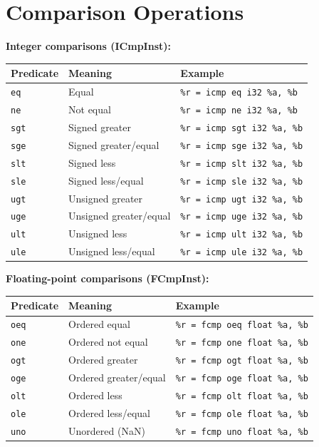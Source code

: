 \section{Comparison Operations}

\textbf{Integer comparisons (ICmpInst):}
\begin{longtable}{|p{2.5cm}|p{3cm}|p{7cm}|}
\hline
\textbf{Predicate} & \textbf{Meaning} & \textbf{Example} \\
\hline
\texttt{eq} & Equal & \texttt{\%r = icmp eq i32 \%a, \%b} \\
\hline
\texttt{ne} & Not equal & \texttt{\%r = icmp ne i32 \%a, \%b} \\
\hline
\texttt{sgt} & Signed greater & \texttt{\%r = icmp sgt i32 \%a, \%b} \\
\hline
\texttt{sge} & Signed greater/equal & \texttt{\%r = icmp sge i32 \%a, \%b} \\
\hline
\texttt{slt} & Signed less & \texttt{\%r = icmp slt i32 \%a, \%b} \\
\hline
\texttt{sle} & Signed less/equal & \texttt{\%r = icmp sle i32 \%a, \%b} \\
\hline
\texttt{ugt} & Unsigned greater & \texttt{\%r = icmp ugt i32 \%a, \%b} \\
\hline
\texttt{uge} & Unsigned greater/equal & \texttt{\%r = icmp uge i32 \%a, \%b} \\
\hline
\texttt{ult} & Unsigned less & \texttt{\%r = icmp ult i32 \%a, \%b} \\
\hline
\texttt{ule} & Unsigned less/equal & \texttt{\%r = icmp ule i32 \%a, \%b} \\
\hline
\end{longtable}

\textbf{Floating-point comparisons (FCmpInst):}
\begin{longtable}{|p{2.5cm}|p{3cm}|p{7cm}|}
\hline
\textbf{Predicate} & \textbf{Meaning} & \textbf{Example} \\
\hline
\texttt{oeq} & Ordered equal & \texttt{\%r = fcmp oeq float \%a, \%b} \\
\hline
\texttt{one} & Ordered not equal & \texttt{\%r = fcmp one float \%a, \%b} \\
\hline
\texttt{ogt} & Ordered greater & \texttt{\%r = fcmp ogt float \%a, \%b} \\
\hline
\texttt{oge} & Ordered greater/equal & \texttt{\%r = fcmp oge float \%a, \%b} \\
\hline
\texttt{olt} & Ordered less & \texttt{\%r = fcmp olt float \%a, \%b} \\
\hline
\texttt{ole} & Ordered less/equal & \texttt{\%r = fcmp ole float \%a, \%b} \\
\hline
\texttt{uno} & Unordered (NaN) & \texttt{\%r = fcmp uno float \%a, \%b} \\
\hline
\end{longtable}

